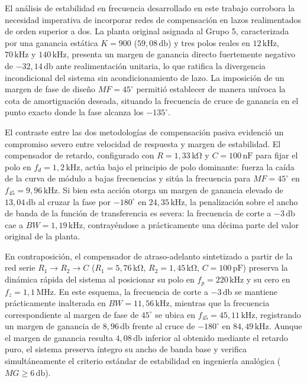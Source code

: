 El análisis de estabilidad en frecuencia desarrollado en este trabajo corrobora la necesidad imperativa de incorporar
redes de compensación en lazos realimentados de orden superior a dos. La planta original asignada al Grupo 5, caracterizada
por una ganancia estática $K = 900$ ($59,08\,\si{\decibel}$) y tres polos reales en $12\,\si{\kilo\hertz}$, $70\,\si{\kilo\hertz}$ y
$140\,\si{\kilo\hertz}$, presenta un margen de ganancia directo fuertemente negativo de $-32,14\,\si{\decibel}$ ante realimentación
unitaria, lo que ratifica la divergencia incondicional del sistema sin acondicionamiento de lazo. La imposición de un margen
de fase de diseño $MF = 45^\circ$ permitió establecer de manera unívoca la cota de amortiguación deseada, situando la
frecuencia de cruce de ganancia en el punto exacto donde la fase alcanza los $-135^\circ$.

El contraste entre las dos metodologías de compensación pasiva evidenció un compromiso severo entre velocidad de respuesta y
margen de estabilidad. El compensador de retardo, configurado con $R = 1,33\,\si{\kilo\ohm}$ y $C = 100\,\si{\nano\farad}$ para fijar
el polo en $f_d = 1,2\,\si{\kilo\hertz}$, actúa bajo el principio de polo dominante: fuerza la caída de la curva de módulo a bajas
frecuencias y sitúa la frecuencia para $MF = 45^\circ$ en $f_{45} = 9,96\,\si{\kilo\hertz}$. Si bien esta acción otorga un margen de
ganancia elevado de $13,04\,\si{\decibel}$ al cruzar la fase por $-180^\circ$ en $24,35\,\si{\kilo\hertz}$, la penalización sobre el
ancho de banda de la función de transferencia es severa: la frecuencia de corte a $-3\,\si{\decibel}$ cae a $BW = 1,19\,\si{\kilo\hertz}$,
contrayéndose a prácticamente una décima parte del valor original de la planta.

En contraposición, el compensador de atraso-adelanto sintetizado a partir de la red serie $R_1 \to R_2 \to C$ ($R_1 = 5,76\,\si{\kilo\ohm}$,
$R_2 = 1,45\,\si{\kilo\ohm}$, $C = 100\,\si{\pico\farad}$) preserva la dinámica rápida del sistema al posicionar su polo en
$f_p = 220\,\si{\kilo\hertz}$ y su cero en $f_z = 1,1\,\si{\mega\hertz}$. En este esquema, la frecuencia de corte a $-3\,\si{\decibel}$
se mantiene prácticamente inalterada en $BW = 11,56\,\si{\kilo\hertz}$, mientras que la frecuencia correspondiente al margen de fase
de $45^\circ$ se ubica en $f_{45} = 45,11\,\si{\kilo\hertz}$, registrando un margen de ganancia de $8,96\,\si{\decibel}$ frente al cruce
de $-180^\circ$ en $84,49\,\si{\kilo\hertz}$. Aunque el margen de ganancia resulta $4,08\,\si{\decibel}$ inferior al obtenido mediante
el retardo puro, el sistema preserva íntegro su ancho de banda base y verifica simultáneamente el criterio estándar de estabilidad
en ingeniería analógica ($MG \ge 6\,\si{\decibel}$).

